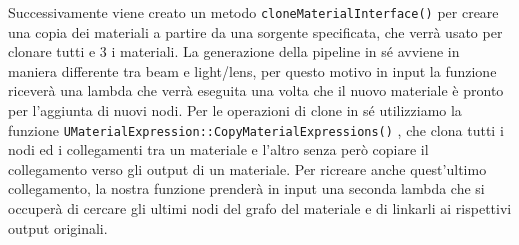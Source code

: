 \documentclass[main.tex]{subfiles}
\begin{document}
Successivamente viene creato un metodo \lstinline{cloneMaterialInterface()} per creare una copia dei materiali a partire da una sorgente specificata, che verrà usato per clonare tutti e 3 i materiali. La generazione della pipeline in sé avviene in maniera differente tra beam e light/lens, per questo motivo in input la funzione riceverà una lambda che verrà eseguita una volta che il nuovo materiale è pronto per l'aggiunta di nuovi nodi. Per le operazioni di clone in sé utilizziamo la funzione \lstinline{UMaterialExpression::CopyMaterialExpressions()} \cite{CopyMaterialExpressions}, che clona tutti i nodi ed i collegamenti tra un materiale e l'altro senza però copiare il collegamento verso gli output di un materiale. Per ricreare anche quest'ultimo collegamento, la nostra funzione prenderà in input una seconda lambda che si occuperà di cercare gli ultimi nodi del grafo del materiale e di linkarli ai rispettivi output originali.
\end{document}
